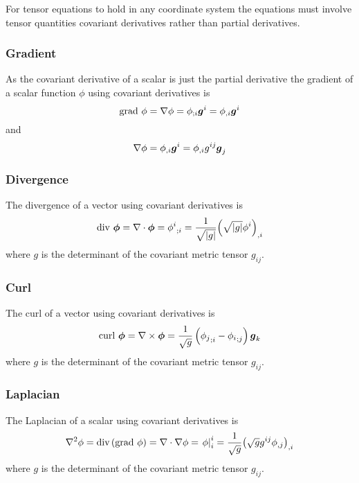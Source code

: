 For tensor equations to hold in any coordinate system the equations must
involve tensor quantities \ie covariant derivatives rather than partial derivatives.

\subsubsection{Gradient}

As the covariant derivative of a scalar is just the partial derivative the
gradient of a scalar function $\phi$ using covariant derivatives is
\begin{equation}
  \text{grad } \phi = \gradient{\phi}=\covarderiv{\phi}{i}\vect{g}^{i}=\partialderiv{\phi}{i}\vect{g}^{i}
\end{equation}
and
\begin{equation}
  \gradient{\phi}=\partialderiv{\phi}{i}\vect{g}^{i}=\partialderiv{\phi}{i}g^{ij}\vect{g}_{j}
\end{equation}

\subsubsection{Divergence}

The divergence of a vector using covariant derivatives is
\begin{equation}
  \text{div } \vect{\phi} = \diverg{\vect{\phi}}=\covarderiv{\phi^{i}}{i}=\frac{1}{\sqrt{\abs{g}}}\partialderiv{\pbrac{\sqrt{\abs{g}}\phi^{i}}}{i}
\end{equation}
where $g$ is the determinant of the covariant metric tensor $g_{ij}$.

\subsubsection{Curl}

The curl of a vector using covariant derivatives is
\begin{equation}
  \text{curl } \vect{\phi} = \curl{\vect{\phi}}=\frac{1}{\sqrt{g}}\pbrac{\covarderiv{\phi_{j}}{i}-\covarderiv{\phi_{i}}{j}}\vect{g}_{k}
\end{equation}
where $g$ is the determinant of the covariant metric tensor $g_{ij}$.

\subsubsection{Laplacian}

The Laplacian of a scalar using covariant derivatives is
\begin{equation}
  \nabla^{2} {\phi}=\text{div}\left( \text{grad }\phi \right)= \nabla\cdot\nabla \phi = \left. \phi \right|^{i}_{i} =\frac{1}{\sqrt{g}} {\left( \sqrt{g}g^{ij} {\phi}_{,j}  \right)}_{,i} 
\end{equation}
where $g$ is the determinant of the covariant metric tensor $g_{ij}$.

